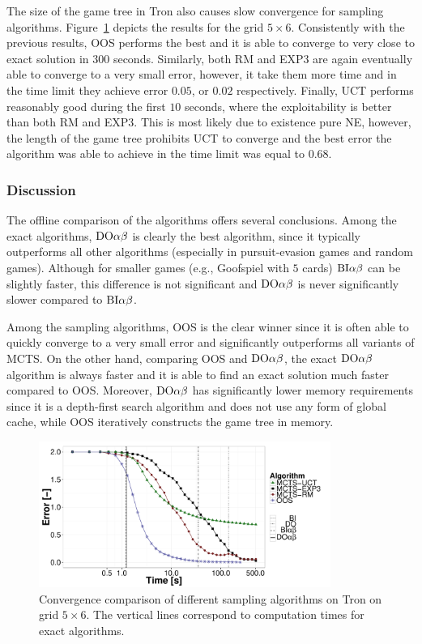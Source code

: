The size of the game tree in Tron also causes slow convergence for sampling algorithms.
Figure~\ref{fig:off:conv:tron} depicts the results for the grid $5\times6$.
Consistently with the previous results, OOS performs the best and it is able to converge to very close to exact solution in $300$ seconds. 
Similarly, both RM and EXP3 are again eventually able to converge to a very small error, however, it take them more time and in the time limit they achieve error $0.05$, or $0.02$ respectively. 
Finally, UCT performs reasonably good during the first $10$ seconds, where the exploitability is better than both RM and EXP3. 
This is most likely due to existence pure NE, however, the length of the game tree prohibits UCT to converge and the best error the algorithm was able to achieve in the time limit was equal to $0.68$.

\subsubsection{Discussion}
The offline comparison of the algorithms offers several conclusions.
Among the exact algorithms, $\textrm{DO}\alpha\beta$ is clearly the best algorithm, since it typically outperforms all other algorithms (especially in pursuit-evasion games and random games). Although for smaller games (e.g., Goofspiel with $5$ cards)  $\textrm{BI}\alpha\beta$ can be slightly faster, this difference is not significant and $\textrm{DO}\alpha\beta$ is never significantly slower compared to $\textrm{BI}\alpha\beta$.

Among the sampling algorithms, OOS is the clear winner since it is often able to quickly converge to a very small error and significantly outperforms all variants of MCTS.
On the other hand, comparing OOS and $\textrm{DO}\alpha\beta$, the exact $\textrm{DO}\alpha\beta$ algorithm is always faster and it is able to find an exact solution much faster compared to OOS.
Moreover, $\textrm{DO}\alpha\beta$ has significantly lower memory requirements since it is a depth-first search algorithm and does not use any form of global cache, while OOS iteratively constructs the game tree in memory.

\begin{figure}
\centering
\includegraphics[width=0.85\textwidth]{figures/convergence-tron.pdf}
\caption{Convergence comparison of different sampling algorithms on Tron on grid $5\times6$. The vertical lines correspond to computation times for exact algorithms.} \label{fig:off:conv:tron}
\end{figure}


